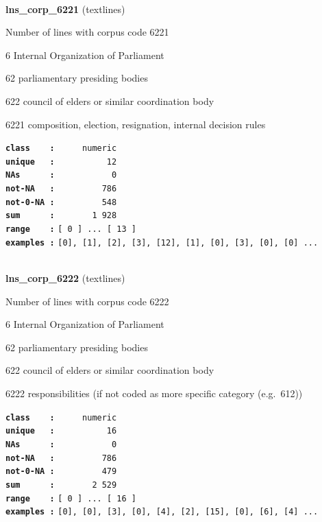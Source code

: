 \documentclass[]{article}
\begin{document}
~

\textbf{lns\_corp\_6221} (textlines)

Number of lines with corpus code 6221

6 Internal Organization of Parliament

62 parliamentary presiding bodies

622 council of elders or similar coordination body

6221 composition, election, resignation, internal decision rules

\textbf{\texttt{class\ \ \ \ :}} \texttt{~~~~~numeric}\\
\textbf{\texttt{unique\ \ \ :}} \texttt{~~~~~~~~~~12}\\
\textbf{\texttt{NAs\ \ \ \ \ \ :}} \texttt{~~~~~~~~~~~0}\\
\textbf{\texttt{not-NA\ \ \ :}} \texttt{~~~~~~~~~786}\\
\textbf{\texttt{not-0-NA\ :}} \texttt{~~~~~~~~~548}\\
\textbf{\texttt{sum\ \ \ \ \ \ :}} \texttt{~~~~~~~1~928}\\
\textbf{\texttt{range\ \ \ \ :}}
\texttt{{[}\ 0\ {]}\ ...\ {[}\ 13\ {]}}\\
\textbf{\texttt{examples\ :}}
\texttt{{[}0{]},\ {[}1{]},\ {[}2{]},\ {[}3{]},\ {[}12{]},\ {[}1{]},\ {[}0{]},\ {[}3{]},\ {[}0{]},\ {[}0{]}\ ...}\\

~

\textbf{lns\_corp\_6222} (textlines)

Number of lines with corpus code 6222

6 Internal Organization of Parliament

62 parliamentary presiding bodies

622 council of elders or similar coordination body

6222 responsibilities (if not coded as more specific category
(e.g.~612))

\textbf{\texttt{class\ \ \ \ :}} \texttt{~~~~~numeric}\\
\textbf{\texttt{unique\ \ \ :}} \texttt{~~~~~~~~~~16}\\
\textbf{\texttt{NAs\ \ \ \ \ \ :}} \texttt{~~~~~~~~~~~0}\\
\textbf{\texttt{not-NA\ \ \ :}} \texttt{~~~~~~~~~786}\\
\textbf{\texttt{not-0-NA\ :}} \texttt{~~~~~~~~~479}\\
\textbf{\texttt{sum\ \ \ \ \ \ :}} \texttt{~~~~~~~2~529}\\
\textbf{\texttt{range\ \ \ \ :}}
\texttt{{[}\ 0\ {]}\ ...\ {[}\ 16\ {]}}\\
\textbf{\texttt{examples\ :}}
\texttt{{[}0{]},\ {[}0{]},\ {[}3{]},\ {[}0{]},\ {[}4{]},\ {[}2{]},\ {[}15{]},\ {[}0{]},\ {[}6{]},\ {[}4{]}\ ...}\\
\end{document}
